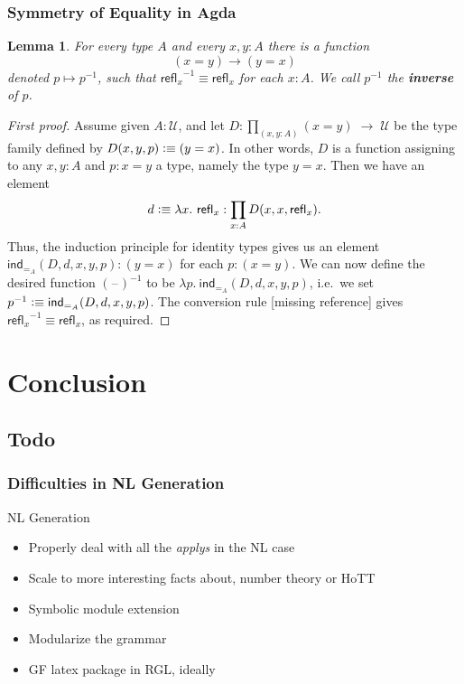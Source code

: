 \documentclass[9pt]{beamer}
\newtheorem{lem}{Lemma}
\newtheorem{proof}%
\newcommand{\jdeq}{\equiv}      %
\newcommand{\refl}[1]{\ensuremath{\mathsf{refl}_{#1}}\xspace}
\newcommand{\define}[1]{\textbf{#1}}
\newcommand{\defeq}{\vcentcolon\equiv}  %
\newcommand{\ind}[1]{\mathsf{ind}_{#1}}
\newcommand{\indid}[1]{\ind{=_{#1}}} %
\newcommand{\blank}{\mathord{\hspace{1pt}\text{--}\hspace{1pt}}}
\newcommand{\opp}[1]{\mathord{{#1}^{-1}}}
\newcommand{\UU}{\ensuremath{\mathcal{U}}\xspace}
\let\type\UU
\begin{document}
\begin{frame}
\frametitle{ Symmetry of Equality in Agda}  



\end{frame}

\begin{frame}
\begin{lem}\label{lem:opp}
  For every type $A$ and every $x,y:A$ there is a function
  \begin{equation*}
    (x= y)\to(y= x)
  \end{equation*}
  denoted $p\mapsto \opp{p}$, such that $\opp{\refl{x}}\jdeq\refl{x}$ for each $x:A$.
  We call $\opp{p}$ the \define{inverse} of $p$.
\end{lem}
\begin{proof}[First proof]
  Assume given $A:\UU$, and
  let $D:{\textstyle\prod_{(x,y:A)}}(x= y) \; \to \; \type$ be the type family defined by $D(x,y,p)\defeq (y= x)$.
  In other words, $D$ is a function assigning to any $x,y:A$ and $p:x=y$ a type, namely the type $y=x$.
  Then we have an element
  \begin{equation*}
    d\defeq \lambda x.\ \refl{x}:\prod_{x:A} D(x,x,\refl{x}).
  \end{equation*}
  Thus, the induction principle for identity types gives us an element
  $\indid{A}(D,d,x,y,p): (y= x)$
  for each $p:(x= y)$.
  We can now define the desired function $\opp{(\blank)}$ to be 
  $\lambda p.\ \indid{A}(D,d,x,y,p)$, 
  i.e.\ we set 
  $\opp{p} \defeq \indid{A}(D,d,x,y,p)$.
  The conversion rule [missing reference] 
  gives $\opp{\refl{x}}\jdeq \refl{x}$, as required.
\end{proof}
\end{frame}


\section{Conclusion}

\subsection{Todo}

\begin{frame}
\frametitle{Difficulties in NL Generation}

\begin{block}{NL Generation}
\begin{itemize}
\item Properly deal with all the \emph{applys} in the NL case
\item Scale to more interesting facts about, number theory or HoTT 
\item Symbolic module extension
\item Modularize the grammar
\item GF latex package in RGL, ideally
\end{itemize}
\end{block}
\end{frame}
\end{document}
